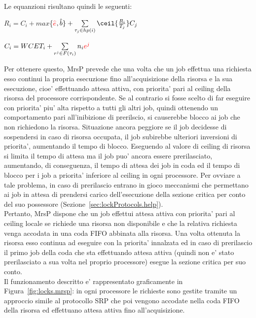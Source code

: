 Le equanzioni risultano quindi le seguenti:\\

\centerline{$R_i = C_i + max$\{\textcolor{red}{$\hat{e}$}$,\hat{b}\} + \sum\limits_{\tau_j \in hp(i)} \ceil{\frac{R_i}{T_j}} C_j$}

\centerline{$C_i = WCET_i + \sum\limits_{r^j \in F(\tau_i)} n_i \textcolor{red}{e^j}$}

\vspace{4 mm}

Per ottenere questo, MrsP prevede che una volta che un job effettua una richiesta esso continui la propria esecuzione fino all’acquisizione della risorsa e la sua esecuzione, cioe' effettuando attesa attiva, con priorita’ pari al ceiling della risorsa del processore corrispondente. Se al contrario si fosse scelto di far eseguire con priorita’ piu’ alta rispetto a tutti gli altri job, quindi ottenendo un comportamento pari all’inibizione di prerilscio, si causerebbe blocco ai job che non richiedono la risorsa. Situazione ancora peggiore se il job decidesse di sospendersi in caso di risorsa occupata, il job subirebbe ulteriori inversioni di priorita’, aumentando il tempo di blocco. Eseguendo al valore di ceiling di risorsa si limita il tempo di attesa ma il job puo’ ancora essere prerilasciato, aumentando, di conseguenza, il tempo di attesa dei job in coda ed il tempo di blocco per i job a priorita' inferiore al ceiling in ogni processore. Per ovviare a tale problema, in caso di prerilascio entrano in gioco meccanismi che permettano ai job in attesa di prendersi carico dell’esecuzione della sezione critica per conto del suo possessore (Sezione~\ref{sec:lockProtocols.help}).\\
Pertanto, MrsP dispone che un job effettui attesa attiva con priorita’ pari al ceiling locale se richiede una risorsa non disponibile e che la relativa richiesta venga accodata in una coda FIFO abbinata alla risorsa. Una volta ottenuta la risorsa esso continua ad eseguire con la priorita’ innalzata ed in caso di prerilascio il primo job della coda che sta effettuando attesa attiva (quindi non e’ stato prerilasciato a sua volta nel proprio processore) esegue la sezione critica per suo conto.\\
Il funzionamento descritto e' rappresentato graficamente in Figura~\ref{fig:locks.mrsp}: in ogni processore le richieste sono gestite tramite un approccio simile al protocollo SRP che poi vengono accodate nella coda FIFO della risorsa ed effettuano attesa attiva fino all'acquisizione.\\

